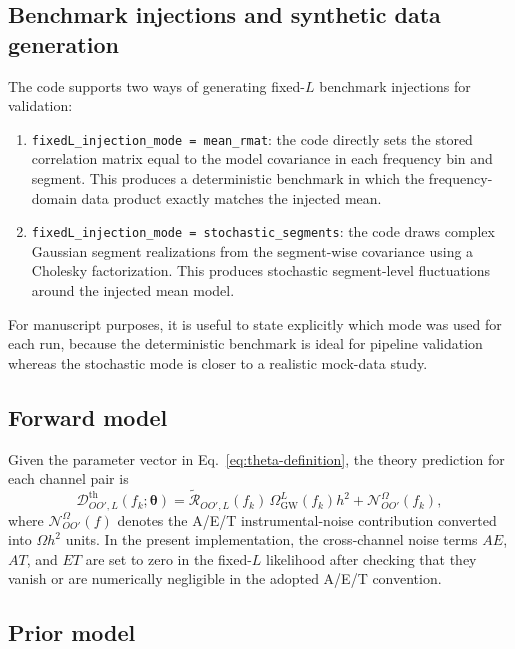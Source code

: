 \documentclass[11pt]{article}
\newcommand{\OmL}{\Omega_{\mathrm{GW}}^{L}}
\newcommand{\Rsp}{\widetilde{\mathcal{R}}}
\newcommand{\Dth}{\mathcal{D}^{\mathrm{th}}}
\newcommand{\vect}[1]{\bm{#1}}
\begin{document}
\subsection{Benchmark injections and synthetic data generation}

The code supports two ways of generating fixed-$L$ benchmark injections for validation:
\begin{enumerate}[leftmargin=2.2em]
  \item \texttt{fixedL\_injection\_mode = mean\_rmat}: the code directly sets the stored correlation matrix equal to the model covariance in each frequency bin and segment. This produces a deterministic benchmark in which the frequency-domain data product exactly matches the injected mean.
  \item \texttt{fixedL\_injection\_mode = stochastic\_segments}: the code draws complex Gaussian segment realizations from the segment-wise covariance using a Cholesky factorization. This produces stochastic segment-level fluctuations around the injected mean model.
\end{enumerate}
For manuscript purposes, it is useful to state explicitly which mode was used for each run, because the deterministic benchmark is ideal for pipeline validation whereas the stochastic mode is closer to a realistic mock-data study.

\subsection{Forward model}

Given the parameter vector in Eq.~\eqref{eq:theta-definition}, the theory prediction for each channel pair is
\begin{equation}
  \Dth_{OO',L}(f_k;\vect{\theta})
  =
  \Rsp_{OO',L}(f_k)\,\OmL(f_k) h^2
  +
  \mathcal{N}^{\Omega}_{OO'}(f_k),
  \label{eq:theory-curve}
\end{equation}
where $\mathcal{N}^{\Omega}_{OO'}(f)$ denotes the A/E/T instrumental-noise contribution converted into $\Omega h^2$ units. In the present implementation, the cross-channel noise terms $AE$, $AT$, and $ET$ are set to zero in the fixed-$L$ likelihood after checking that they vanish or are numerically negligible in the adopted A/E/T convention.

\subsection{Prior model}
\end{document}
